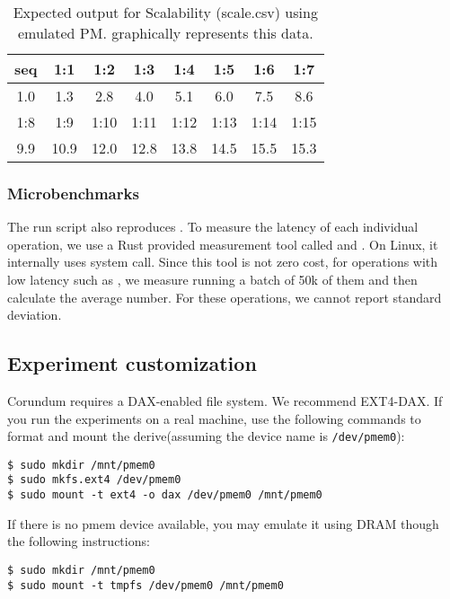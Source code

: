 {\begin{table}[!ht]
  
  \begin{tabular}{|c|c|c|c|c|c|c|c|} \hline
    seq&1:1&1:2&1:3&1:4&1:5&1:6&1:7\\\hline
    1.0&1.3&2.8&4.0&5.1&6.0&7.5&8.6\\\hline\hline
    1:8&1:9&1:10&1:11&1:12&1:13&1:14&1:15\\\hline
    9.9&10.9&12.0&12.8&13.8&14.5&15.5&15.3\\\hline
  \end{tabular}
  \caption{Expected output for Scalability (scale.csv) using emulated PM.  graphically represents this data.}
  \label{tbl:scale}
\end{table}


\subsubsection{Microbenchmarks}
The run script also reproduces . To measure the latency of each individual operation, we use a Rust provided measurement tool called  and . On Linux, it internally uses  system call. Since this tool is not zero cost, for operations with low latency such as , we measure running a batch of 50k of them and then calculate the average number. For these operations, we cannot report standard deviation.

\subsection{Experiment customization}

Corundum requires a DAX-enabled file system. We recommend EXT4-DAX. If you run the experiments on a real machine, use the following commands to format and mount the derive(assuming the device name is \verb+/dev/pmem0+):

\begin{verbatim}
$ sudo mkdir /mnt/pmem0
$ sudo mkfs.ext4 /dev/pmem0
$ sudo mount -t ext4 -o dax /dev/pmem0 /mnt/pmem0
\end{verbatim}

If there is no pmem device available, you may emulate it using DRAM though the following instructions:

\begin{verbatim}
$ sudo mkdir /mnt/pmem0
$ sudo mount -t tmpfs /dev/pmem0 /mnt/pmem0
\end{verbatim}

}

